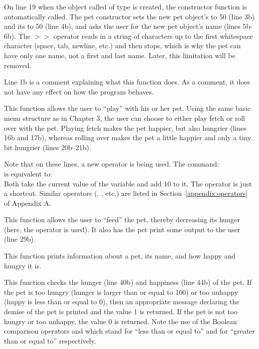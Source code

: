 On line 19 when the object called  of type  is created, the constructor function  is automatically called.  The pet constructor sets the new pet object's  to 50 (line 3b) and its  to 50 (line 4b), and asks the user for the new pet object's name (lines 5b-6b).  The $>>$ operator reads in a string of characters up to the first whitespace character (space, tab, newline, etc.) and then stops, which is why the pet can have only one name, not a first and last name.  Later, this limitation will be removed.

Line 1b is a comment explaining what this function does.  As a comment, it does not have any effect on how the program behaves. 


This function allows the user to ``play'' with his or her pet.  Using the same basic menu structure as in Chapter 3, the user can choose to either play fetch or roll over with the pet.  Playing fetch makes the pet happier, but also hungrier (lines 16b and 17b), whereas rolling over makes the pet a little happier and only a tiny bit hungrier (lines 20b--21b).  

Note that on these lines, a new operator \codefont{+=} is being used.  The command:\\
is equivalent to:\\
Both take the current value of the variable  and add 10 to it.  The \codefont{+=} operator is just a shortcut.  Similar operators (\codefont{-=}, \codefont{*=}, etc.) are listed in Section~\ref{appendix:operators} of Appendix A.


This function allows the user to ``feed'' the pet, thereby decreasing its hunger (here, the \codefont{-=} operator is used).
It also has the pet print some output to the user (line 29b).


This function prints information about a pet, its name, and how happy and hungry it is.  


This function checks the hunger (line 40b) and happiness (line 44b) of the pet.  If the pet is too hungry (hunger is larger than or equal to 100) or too unhappy (happy is less than or equal to 0), then an appropriate message declaring the demise of the pet is printed and the value 1 is returned.  If the pet is not too hungry or too unhappy, the value 0 is returned.  Note the use of the Boolean comparison operators \codefont{$<=$} and \codefont{$>=$} which stand for ``less than or equal to'' and for ``greater than or equal to'' respectively.

